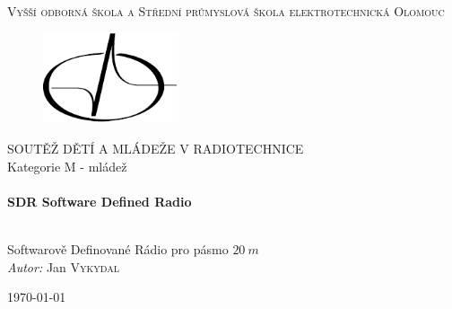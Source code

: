 \begin{titlepage}
  \begin{center}


  \textsc{\LARGE Vyšší odborná škola a Střední průmyslová škola elektrotechnická Olomouc}%

	\begin{figure}[H]
    \centering
    \includegraphics[width=4cm]{img/logo/logo.pdf}
  \end{figure}

  \textsc{\Large SOUTĚŽ DĚTÍ A MLÁDEŽE V RADIOTECHNICE}\\[0.5cm]
  Kategorie M - mládež\\[.2cm]
	
	
	
  \HRule \\[0.4cm]
  { \huge \bfseries SDR Software Defined Radio\\[0.4cm] }

  \HRule \\[.5cm]
  
  Softwarově Definované Rádio pro pásmo $20~m$\\[1.5cm]
		
  \emph{Autor:} Jan \textsc{Vykydal}
  
  \vfill

  {\large \today}

  \end{center}
\end{titlepage}
